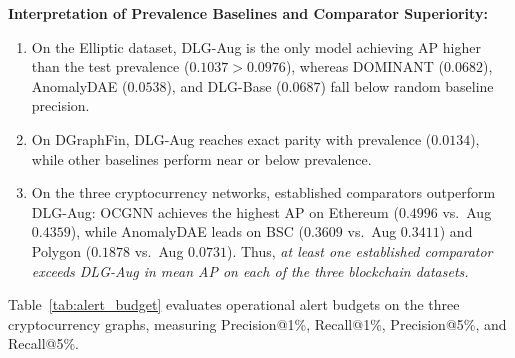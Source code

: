 \documentclass[11pt,a4paper]{article}
\begin{document}
\textbf{Interpretation of Prevalence Baselines and Comparator Superiority:}
\begin{enumerate}
    \item On the Elliptic dataset, DLG-Aug is the only model achieving AP higher than the test prevalence ($0.1037 > 0.0976$), whereas DOMINANT ($0.0682$), AnomalyDAE ($0.0538$), and DLG-Base ($0.0687$) fall below random baseline precision.
    \item On DGraphFin, DLG-Aug reaches exact parity with prevalence ($0.0134$), while other baselines perform near or below prevalence.
    \item On the three cryptocurrency networks, established comparators outperform DLG-Aug: OCGNN achieves the highest AP on Ethereum ($0.4996$ vs.\ Aug $0.4359$), while AnomalyDAE leads on BSC ($0.3609$ vs.\ Aug $0.3411$) and Polygon ($0.1878$ vs.\ Aug $0.0731$). Thus, \textit{at least one established comparator exceeds DLG-Aug in mean AP on each of the three blockchain datasets.}
\end{enumerate}

Table~\ref{tab:alert_budget} evaluates operational alert budgets on the three cryptocurrency graphs, measuring Precision@1\%, Recall@1\%, Precision@5\%, and Recall@5\%.
\end{document}

